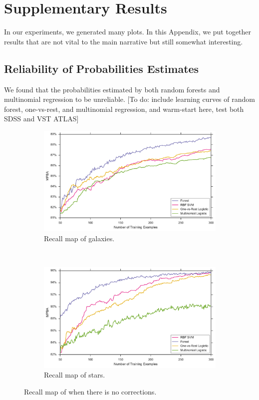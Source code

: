 \chapter{Supplementary Results}
\label{cha:supp}

In our experiments, we generated many plots. In this Appendix, we put together results
that are not vital to the main narrative but still somewhat interesting.

\section{Reliability of Probabilities Estimates}
\label{sec:forest_prob}
We found that the probabilities estimated by both random forests and multinomial regression
to be unreliable. [To do: include learning curves of random forest, one-vs-rest, and
multinomial regression, and warm-start here, test both SDSS and VST ATLAS]

\begin{figure}[p]
	\centering
	\begin{subfigure}{\textwidth}
		\centering
		\includegraphics[width=\textwidth]{figures/appendix/sdss_forest_multinom}
		\caption{Recall map of galaxies.}
		\label{fig:sdss_forest_multinom}
	\end{subfigure}\\
	\begin{subfigure}{\textwidth}
		\centering
		\includegraphics[width=\linewidth]{figures/appendix/vstatlas_forest_multinom}
		\caption{Recall map of stars.}
		\label{fig:vstatlas_forest_multinom}
	\end{subfigure}
	\caption{Recall map of when there is no corrections.}
	\label{fig:forest_multinom}
\end{figure}


